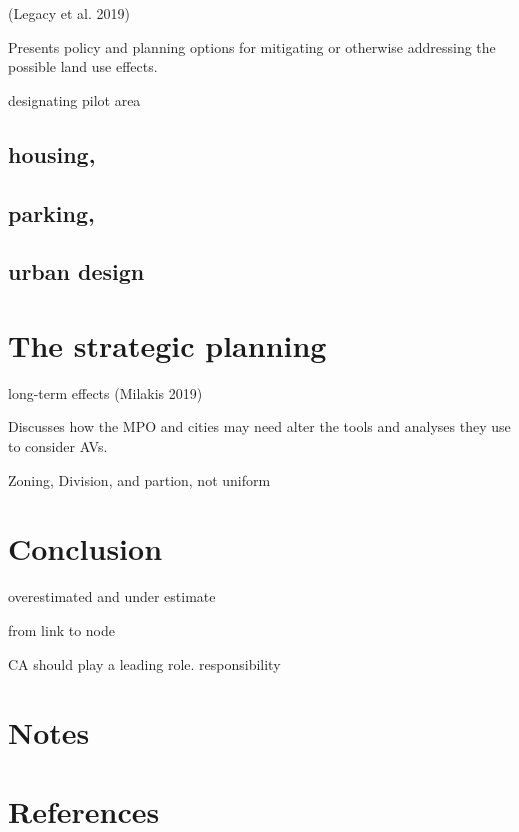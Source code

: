 \documentclass[12pt,]{article}
\begin{document}
(Legacy et al. 2019)

Presents policy and planning options for mitigating or otherwise
addressing the possible land use effects.

designating pilot area

\hypertarget{housing}{%
\subsection{housing,}\label{housing}}

\hypertarget{parking}{%
\subsection{parking,}\label{parking}}

\hypertarget{urban-design}{%
\subsection{urban design}\label{urban-design}}

\hypertarget{the-strategic-planning}{%
\section{The strategic planning}\label{the-strategic-planning}}

long-term effects (Milakis 2019)

Discusses how the MPO and cities may need alter the tools and analyses
they use to consider AVs.

Zoning, Division, and partion, not uniform

\hypertarget{conclusion}{%
\section{Conclusion}\label{conclusion}}

overestimated and under estimate

from link to node

CA should play a leading role. responsibility

\hypertarget{notes}{%
\section{Notes}\label{notes}}

\hypertarget{references}{%
\section*{References}\label{references}}
\end{document}
